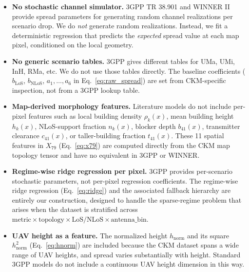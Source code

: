 \documentclass[11pt,a4paper]{article}
\begin{document}
\begin{itemize}
\item \textbf{No stochastic channel simulator.}
      3GPP TR 38.901 and WINNER II provide spread parameters for generating
      random channel realizations per scenario drop. We do \emph{not} generate
      random realizations. Instead, we fit a deterministic regression that
      predicts the \emph{expected} spread value at each map pixel, conditioned
      on the local geometry.

\item \textbf{No generic scenario tables.}
      3GPP gives different tables for UMa, UMi, InH, RMa, etc. We do not
      use those tables directly. The baseline coefficients ($b_{\mathrm{LoS}}$,
      $b_{\mathrm{NLoS}}$, $a_1,\ldots,a_6$ in Eq.~\ref{eq:raw_spread}) are
      set from CKM-specific inspection, not from a 3GPP lookup table.

\item \textbf{Map-derived morphology features.}
      Literature models do not include per-pixel features such as local building
      density $\rho_k(x)$, mean building height $h_k(x)$, NLoS-support fraction
      $n_k(x)$, blocker depth $b_{41}(x)$, transmitter clearance $c_{41}(x)$,
      or taller-building fraction $t_{41}(x)$. These 11 spatial features in
      $X_{79}$ (Eq.~\ref{eq:x79}) are computed directly from the CKM map
      topology tensor and have no equivalent in 3GPP or WINNER.

\item \textbf{Regime-wise ridge regression per pixel.}
      3GPP provides per-scenario stochastic parameters, not per-pixel
      regression coefficients. The regime-wise ridge regression
      (Eq.~\ref{eq:ridge}) and the associated fallback hierarchy are entirely
      our construction, designed to handle the sparse-regime problem that arises
      when the dataset is stratified across
      $\mathrm{metric} \times \mathrm{topology} \times \mathrm{LoS/NLoS} \times
      \mathrm{antenna\_bin}$.

\item \textbf{UAV height as a feature.}
      The normalized height $h_{\mathrm{norm}}$ and its square
      $h_{\mathrm{norm}}^2$ (Eq.~\ref{eq:hnorm}) are included because the CKM
      dataset spans a wide range of UAV heights, and spread varies substantially
      with height. Standard 3GPP models do not include a continuous UAV height
      dimension in this way.
\end{itemize}
\end{document}
